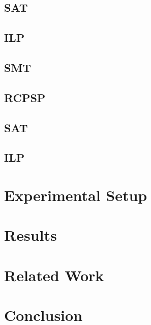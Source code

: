 \documentclass{sig-alternate}
\begin{document}
\subsection{SAT}
\subsection{ILP}
\subsection{SMT}

\subsection{RCPSP}

\subsection{SAT}
\subsection{ILP}

\section{Experimental Setup}

\section{Results}

\section{Related Work}

\cite{alves2013resource}
\cite{abio2014encoding}
\cite{wu2013exploiting}
\cite{velev2009exploiting}
\cite{horbach2010boolean}
\cite{klein1999computing}
\cite{mingozzi1998exact}
\cite{sharma2011polynomial}
\cite{ramani2004breaking}
\cite{schutt2011explaining}
\cite{wille2008using}
\cite{malaguti2010survey}
\cite{cs395tGCtoSAT}

\section{Conclusion}



\end{document}
